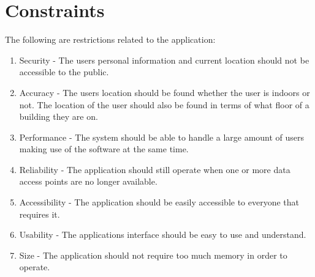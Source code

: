 \documentclass[11pt,a4paper]{report}
\begin{document}
	\section{Constraints}
	The following are restrictions related to the application:
		\begin{enumerate}
				\renewcommand{\labelenumi}{{\textbf{\arabic{enumi}.}}}
				\item Security  - The users personal information and current location should not be accessible to the public.
				\item Accuracy - The users location should be found whether the user is indoors or not. The location of the user should also be found in terms of what floor of a building they are on.
				\item Performance - The system should be able to handle a large amount of users making use of the software at the same time.
				\item Reliability - The application should still operate when one or more data access points are no longer available.
				\item Accessibility - The application should be easily accessible to everyone that requires it.
				\item Usability - The applications interface should be easy to use and understand.
				\item Size - The application should not require too much memory in order to operate.
				\end{enumerate}
\end{document}
